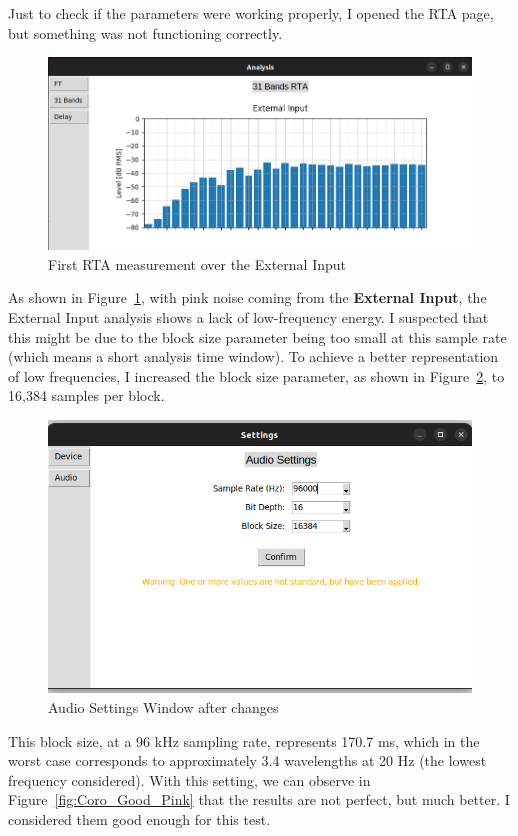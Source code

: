 Just to check if the parameters were working properly, I opened the RTA page, but something was not functioning correctly.

\begin{figure}[H]
	\centering
	\includegraphics[width=0.8
	\linewidth]{Figures/Coro_Pink_Bad.png}
	\caption{First RTA measurement over the External Input}
	\label{fig:Coro_Bad_Pink}
\end{figure}

As shown in Figure~\ref{fig:Coro_Bad_Pink}, with pink noise coming from the \textbf{External Input}, the External Input analysis shows a lack of low-frequency energy. I suspected that this might be due to the block size parameter being too small at this sample rate (which means a short analysis time window). To achieve a better representation of low frequencies, I increased the block size parameter, as shown in Figure~\ref{fig:Coro_audio_settings}, to 16,384 samples per block.

\begin{figure}[H]
	\centering
	\includegraphics[width=0.8
	\linewidth]{Figures/Coro_audio_settings.png}
	\caption{Audio Settings Window after changes}
	\label{fig:Coro_audio_settings}
\end{figure}

This block size, at a 96 kHz sampling rate, represents 170.7 ms, which in the worst case corresponds to approximately 3.4 wavelengths at 20 Hz (the lowest frequency considered). With this  setting, we can observe in Figure~\ref{fig:Coro_Good_Pink} that the results are not perfect, but much better. I considered them good enough for this test.

